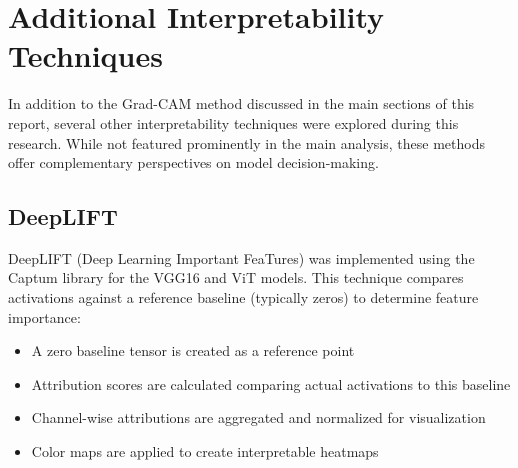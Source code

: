 \documentclass[a4paper,12pt]{report}
\begin{document}

\section{Additional Interpretability Techniques}
\label{appendix:add_interpret}

In addition to the Grad-CAM method discussed in the main sections of this report, several other interpretability techniques were explored during this research. While not featured prominently in the main analysis, these methods offer complementary perspectives on model decision-making.

\subsection{DeepLIFT}

DeepLIFT (Deep Learning Important FeaTures) was implemented using the Captum library for the VGG16 and ViT models. This technique compares activations against a reference baseline (typically zeros) to determine feature importance:

\begin{itemize}
    \item A zero baseline tensor is created as a reference point
    \item Attribution scores are calculated comparing actual activations to this baseline
    \item Channel-wise attributions are aggregated and normalized for visualization
    \item Color maps are applied to create interpretable heatmaps
\end{itemize}
\end{document}

